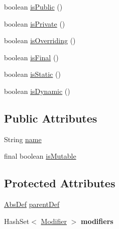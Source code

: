 \begin{DoxyCompactItemize}
boolean \hyperlink{classcompiler_1_1abstr_1_1tree_1_1def_1_1_abs_def_ac955a59bc0daa524db3803a340559d2e}{is\+Public} ()
\item 
boolean \hyperlink{classcompiler_1_1abstr_1_1tree_1_1def_1_1_abs_def_a164b3c142f26b155920d9e2c11b0488e}{is\+Private} ()
\item 
boolean \hyperlink{classcompiler_1_1abstr_1_1tree_1_1def_1_1_abs_def_adcd6421548a4229b77a3f4f36e256cee}{is\+Overriding} ()
\item 
boolean \hyperlink{classcompiler_1_1abstr_1_1tree_1_1def_1_1_abs_def_aa5c058d52fc0d1dd9bf48a2ca8cd32dd}{is\+Final} ()
\item 
boolean \hyperlink{classcompiler_1_1abstr_1_1tree_1_1def_1_1_abs_def_a2375692fd3ae881499ba2eb360d061e6}{is\+Static} ()
\item 
boolean \hyperlink{classcompiler_1_1abstr_1_1tree_1_1def_1_1_abs_def_ac681f6828c0fb2ee460fc6c89323fe75}{is\+Dynamic} ()
\end{DoxyCompactItemize}
\subsection*{Public Attributes}
\begin{DoxyCompactItemize}
\item 
String \hyperlink{classcompiler_1_1abstr_1_1tree_1_1def_1_1_abs_def_ac6bda9377f5abbb5f1be7d3d1b16481b}{name}
\item 
final boolean \hyperlink{classcompiler_1_1abstr_1_1tree_1_1def_1_1_abs_def_adf1015b5167218d03ec28a486fcf4b66}{is\+Mutable}
\end{DoxyCompactItemize}
\subsection*{Protected Attributes}
\begin{DoxyCompactItemize}
\item 
\hyperlink{classcompiler_1_1abstr_1_1tree_1_1def_1_1_abs_def}{Abs\+Def} \hyperlink{classcompiler_1_1abstr_1_1tree_1_1def_1_1_abs_def_ac35f1370ca3666f91a4f10949077f3ba}{parent\+Def}
\item 
\mbox{\label{classcompiler_1_1abstr_1_1tree_1_1def_1_1_abs_def_a6ed0dd47857d8e3795f919f384566523}} 
Hash\+Set$<$ \hyperlink{enumcompiler_1_1abstr_1_1tree_1_1_modifier}{Modifier} $>$ {\bfseries modifiers}
\end{DoxyCompactItemize}


